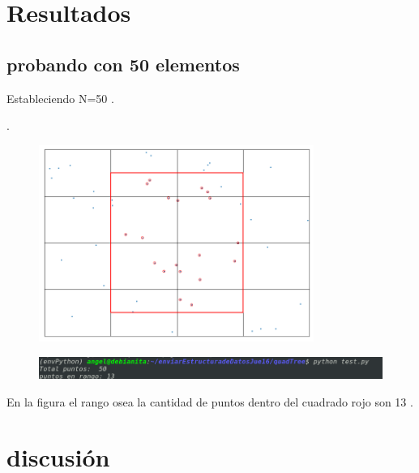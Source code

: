 \section{Resultados}



\subsection{probando con 50 elementos }

Estableciendo N=50 .






   

   .

   



\begin{figure}[H]
  \centering
  \includegraphics[width=0.8\textwidth]{imagenes/search-quadtree.png}
\end{figure}


\begin{figure}[H]
  \centering
  \includegraphics[width=1\textwidth]{imagenes/rango.png}
\end{figure}

En la figura  el rango osea la cantidad de puntos  dentro del cuadrado rojo son 13 \cite{repo}.

\section{discusión}



